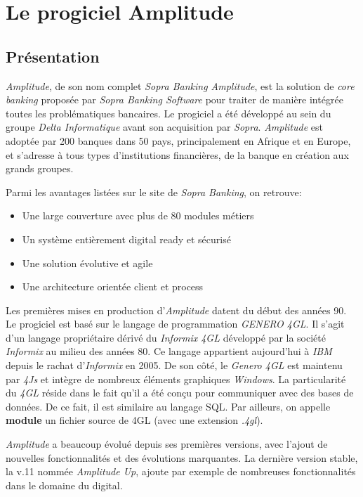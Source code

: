 \documentclass{polytech/polytech}
\begin{document}
\chapter{Le progiciel Amplitude}

\section{Présentation}

\textit{Amplitude}, de son nom complet \textit{Sopra Banking Amplitude}, est la solution de \textit{core banking} proposée par \textit{Sopra Banking Software} pour traiter de manière intégrée toutes les problématiques bancaires. Le progiciel a été développé au sein du groupe \textit{Delta Informatique} avant son acquisition par \textit{Sopra}. \textit{Amplitude} est adoptée par 200 banques dans 50 pays, principalement en Afrique et en Europe, et s’adresse à tous types d’institutions financières, de la banque en création aux grands groupes.

Parmi les avantages listées sur le site de \textit{Sopra Banking}, on retrouve: 

\begin{itemize}
	\item Une large couverture avec plus de 80 modules métiers
	\item Un système entièrement digital ready et sécurisé
	\item Une solution évolutive et agile
	\item Une architecture orientée client et process	
\end{itemize}

Les premières mises en production d'\textit{Amplitude} datent du début des années 90. Le progiciel est basé sur le langage de programmation \textit{GENERO 4GL}. Il s'agit d'un langage propriétaire dérivé du \textit{Informix 4GL} développé par la société \textit{Informix} au milieu des années 80. Ce langage appartient aujourd'hui à \textit{IBM} depuis le rachat d'\textit{Informix} en 2005. De son côté, le \textit{Genero 4GL} est maintenu par \textit{4Js} et intègre de nombreux éléments graphiques \textit{Windows}. La particularité du \textit{4GL} réside dans le fait qu'il a été conçu pour communiquer avec des bases de données. De ce fait, il est similaire au langage SQL. Par ailleurs, on appelle \textbf{module} un fichier source de 4GL (avec une extension \textit{.4gl}).

\textit{Amplitude} a beaucoup évolué depuis ses premières versions, avec l'ajout de nouvelles fonctionnalités et des évolutions marquantes. La dernière version stable, la v.11 nommée \textit{Amplitude Up}, ajoute par exemple de nombreuses fonctionnalités dans le domaine du digital.
\end{document}
